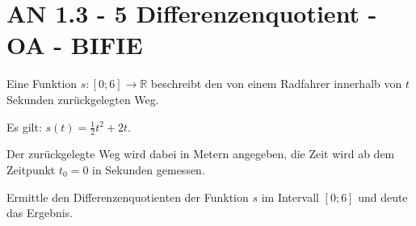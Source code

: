 \section{AN 1.3 - 5 Differenzenquotient - OA - BIFIE}


\begin{beispiel}[AN 1.3]{1} %
Eine Funktion $s:[0;6]\rightarrow \mathbb{R}$ beschreibt den von einem Radfahrer innerhalb von $t$ Sekunden zurückgelegten Weg.

\leer

Es gilt: $s(t)=\frac{1}{2}t^2+2t$.

Der zurückgelegte Weg wird dabei in Metern angegeben, die Zeit wird ab dem Zeitpunkt $t_0=0$ in Sekunden gemessen.

\leer

Ermittle den Differenzenquotienten der Funktion $s$ im Intervall $[0; 6]$ und deute das Ergebnis.

\end{beispiel}